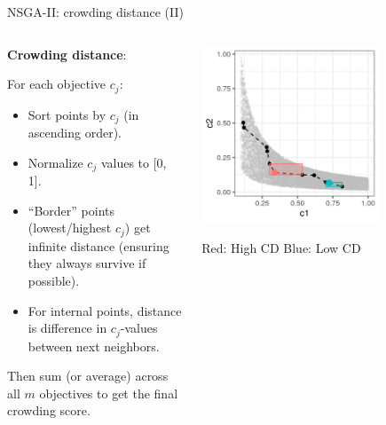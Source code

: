 \documentclass[11pt,compress,t,notes=noshow,xcolor=table]{beamer}
\begin{document}
\begin{vbframe}{NSGA-II: crowding distance (II)}

\begin{columns}
\begin{column}{0.55\textwidth}
\textbf{Crowding distance}:

For each objective $c_j$:
\begin{itemize}
\item Sort points by $c_j$ (in ascending order).
\item Normalize $c_j$ values to [0, 1].
\item “Border” points (lowest/highest $c_j$) get infinite distance (ensuring they always survive if possible).
\item For internal points, distance is difference in $c_j$-values between next neighbors.
\end{itemize}
Then sum (or average) across all $m$ objectives to get the final crowding score.
\end{column}

\begin{column}{0.45\textwidth}
\begin{center}
\includegraphics[width=0.7\textwidth]{slides/11-multicrit/figure_man/NSGA2_CS2.png}
\medskip

\begin{footnotesize}
Red: High CD \quad Blue: Low CD
\end{footnotesize}
\end{center}
\end{column}
\end{columns}

\end{vbframe}
\end{document}
